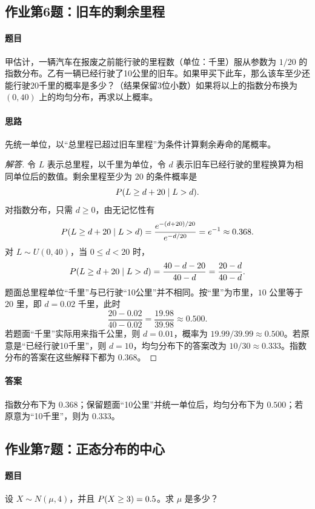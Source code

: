 \subsection{作业第6题：旧车的剩余里程}\label{ex:w08-h6}
\paragraph{题目}
甲估计，一辆汽车在报废之前能行驶的里程数（单位：千里）服从参数为 $1/20$ 的指数分布。乙有一辆已经行驶了10公里的旧车。如果甲买下此车，那么该车至少还能行驶20千里的概率是多少？（结果保留3位小数）如果将以上的指数分布换为 $(0,40)$ 上的均匀分布，再求以上概率。
\paragraph{思路} 先统一单位，以“总里程已超过旧车里程”为条件计算剩余寿命的尾概率。
\begin{proof}[解答]
令 $L$ 表示总里程，以千里为单位，令 $d$ 表示旧车已经行驶的里程换算为相同单位后的数值。剩余里程至少为 $20$ 的条件概率是
\[
\P(L\geq d+20\mid L>d).
\]
对指数分布，只需 $d\geq0$，由无记忆性有
\[
\P(L\geq d+20\mid L>d)
=\frac{e^{-(d+20)/20}}{e^{-d/20}}
=e^{-1}\approx0.368.
\]
对 $L\sim U(0,40)$，当 $0\leq d<20$ 时，
\[
\P(L\geq d+20\mid L>d)
=\frac{40-d-20}{40-d}=\frac{20-d}{40-d}.
\]
题面总里程单位“千里”与已行驶“10公里”并不相同。按“里”为市里，$10$ 公里等于 $20$ 里，即 $d=0.02$ 千里，此时
\[
\frac{20-0.02}{40-0.02}=\frac{19.98}{39.98}\approx0.500.
\]
若题面“千里”实际用来指千公里，则 $d=0.01$，概率为 $19.99/39.99\approx0.500$。若原意是“已经行驶10千里”，则 $d=10$，均匀分布下的答案改为 $10/30\approx0.333$。指数分布的答案在这些解释下都为 $0.368$。
\end{proof}
\paragraph{答案} 指数分布下为 $0.368$；保留题面“10公里”并统一单位后，均匀分布下为 $0.500$；若原意为“10千里”，则为 $0.333$。

\subsection{作业第7题：正态分布的中心}\label{ex:w08-h7}
\paragraph{题目}
设 $X\sim N(\mu,4)$，并且 $\P(X\geq3)=0.5$。求 $\mu$ 是多少？
